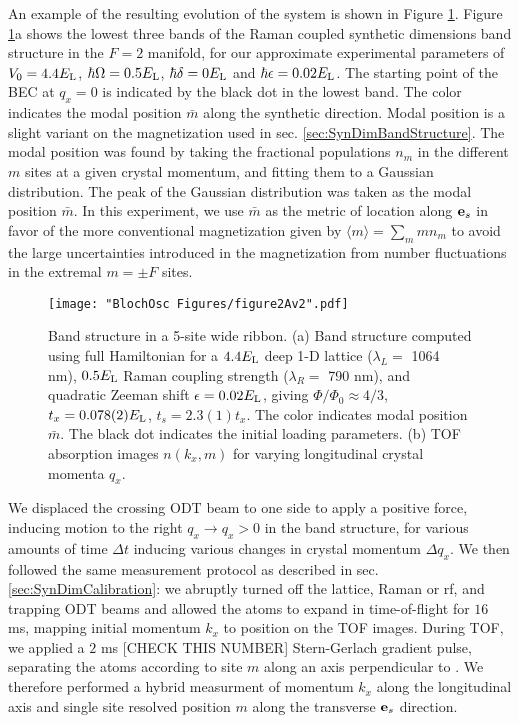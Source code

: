 An example of the resulting evolution of the system is shown in Figure \ref{fig:kickBsTOF}. Figure \ref{fig:kickBsTOF}a shows the lowest three bands of the Raman coupled synthetic dimensions band structure in the $F=2$ manifold, for our approximate experimental parameters of $V_0 = 4.4 E_{\rm L}$, $\hbar\Omega = 0.5 E_{\rm L}$, $\hbar\delta = 0 E_{\rm L}$ and $\hbar\epsilon = 0.02 E_{\rm L}$. The starting point of the BEC at $q_x=0$ is indicated by the black dot in the lowest band. The color indicates the modal position $\bar{m}$ along the synthetic direction. Modal position is a slight variant on the magnetization used in sec. \ref{sec:SynDimBandStructure}. The modal position was found by taking the fractional populations $n_{m}$ in the different $m$ sites at a given crystal momentum, and fitting them to a Gaussian distribution. The peak of the Gaussian distribution was taken as the modal position $\bar{m}$. In this experiment, we use $\bar{m}$ as the metric of location along $\textbf{e}_s{}$ in favor of the more conventional magnetization given by $\langle m\rangle=\sum_{m}m n_{m}$ to avoid the large uncertainties introduced in the magnetization from number fluctuations in the extremal $m=\pm F$ sites. 
\begin{figure}
\texttt{[image: "BlochOsc Figures/figure2Av2".pdf]}
\caption[Band structure in a 5-site wide ribbon]{Band structure in a 5-site wide ribbon. (a) Band structure computed using full Hamiltonian for a $4.4 E_{\rm L}$ deep 1-D lattice ($\lambda_L=$ 1064 nm), $0.5 E_{\rm L}$ Raman coupling strength ($\lambda_R = $ 790 nm), and quadratic Zeeman shift $\epsilon=0.02 E_{\rm L}$, giving $\Phi/\Phi_0 \approx 4/3$, $t_x = 0.078(2) E_{\rm L}$, $t_s=2.3(1) t_x$. The color indicates modal position $\bar{m}$. The black dot indicates the initial loading parameters.  (b) TOF absorption images $n(k_x,m)$ for varying longitudinal crystal momenta $q_x$.  }
\label{fig:kickBsTOF}
\end{figure}

We displaced the crossing ODT beam to one side to apply a positive force, inducing motion to the right $q_x\rightarrow q_x>0$ in the band structure, for various amounts of time $\Delta t$ inducing various changes in crystal momentum $\Delta q_x$. We then followed the same measurement protocol as described in sec. \ref{sec:SynDimCalibration}: we abruptly turned off the lattice, Raman or rf, and trapping ODT beams and allowed the atoms to expand in time-of-flight for $16$ ms, mapping initial momentum $k_x$ to position on the TOF images.  During TOF, we applied a $2$ ms [CHECK THIS NUMBER] Stern-Gerlach gradient pulse, separating the atoms according to site $m$ along an axis perpendicular to \ex{}. We therefore performed a hybrid measurment of momentum $k_x$ along the longitudinal \ex{} axis and single site resolved position $m$ along the transverse $\textbf{e}_s{}$ direction. 

